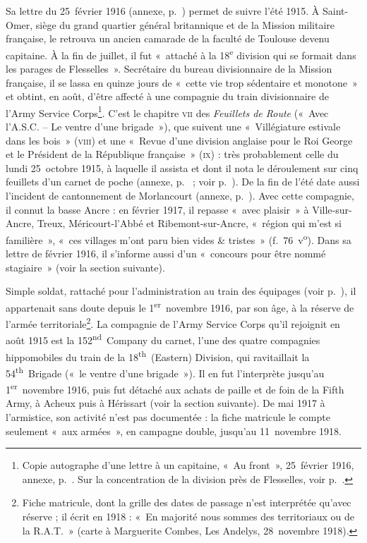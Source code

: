 Sa lettre du 25~février 1916 (annexe, p.~\pageref{annexe:doc1}) permet de suivre l'été 1915. À Saint-Omer, siège du grand quartier général britannique et de la Mission militaire française, le retrouva un ancien camarade de la faculté de Toulouse devenu capitaine. À la fin de juillet, il fut «~attaché à la 18\textsuperscript{e} division qui se formait dans les parages de Flesselles~». Secrétaire du bureau divisionnaire de la Mission française, il se lassa en quinze jours de «~cette vie trop sédentaire et monotone~» et obtint, en août, d'être affecté à une compagnie du train divisionnaire de l'Army Service Corps\footnote{Copie autographe d'une lettre à un capitaine, «~Au front~», 25~février 1916, annexe, p.~\pageref{annexe:doc1}. Sur la concentration de la division près de Flesselles, voir p.~\pageref{intro:division}.}. C'est le chapitre \textsc{vii} des \textit{Feuillets de Route} («~Avec l'A.S.C. – Le ventre d'une brigade~»), que suivent une «~Villégiature estivale dans les bois~» (\textsc{viii}) et une «~Revue d'une division anglaise pour le Roi George et le Président de la République française~» (\textsc{ix}) : très probablement celle du lundi 25~octobre 1915, à laquelle il assista et dont il nota le déroulement sur cinq feuillets d'un carnet de poche (annexe, p.~\pageref{annexe:doc7} ; voir p.~\pageref{intro:revue}). De la fin de l'été date aussi l'incident de cantonnement de Morlancourt (annexe, p.~\pageref{annexe:doc2}). Avec cette compagnie, il connut la basse Ancre : en février 1917, il repasse «~avec plaisir~» à Ville-sur-Ancre, Treux, Méricourt-l'Abbé et Ribemont-sur-Ancre, «~région qui m'est si familière~», «~ces villages m'ont paru bien vides \& tristes~» (f.~76~v\textsuperscript{o}). Dans sa lettre de février 1916, il s'informe aussi d'un «~concours pour être nommé stagiaire~» (voir la section suivante).

Simple soldat, rattaché pour l'administration au train des équipages (voir p.~\pageref{intro:statut}), il appartenait sans doute depuis le 1\textsuperscript{er}~novembre 1916, par son âge, à la réserve de l'armée territoriale\footnote{Fiche matricule, dont la grille des dates de passage n'est interprétée qu'avec réserve ; il écrit en 1918 : «~En majorité nous sommes des territoriaux ou de la R.A.T.~» (carte à Marguerite Combes, Les Andelys, 28~novembre 1918).}. La compagnie de l'Army Service Corps qu'il rejoignit en août 1915 est la 152\textsuperscript{nd}~Company du carnet, l'une des quatre compagnies hippomobiles du train de la 18\textsuperscript{th}~(Eastern) Division, qui ravitaillait la 54\textsuperscript{th}~Brigade («~le ventre d'une brigade~»). Il en fut l'interprète jusqu'au 1\textsuperscript{er}~novembre 1916, puis fut détaché aux achats de paille et de foin de la Fifth Army, à Acheux puis à Hérissart (voir la section suivante). De mai 1917 à l'armistice, son activité n'est pas documentée : la fiche matricule le compte seulement «~aux armées~», en campagne double, jusqu'au 11~novembre 1918.

